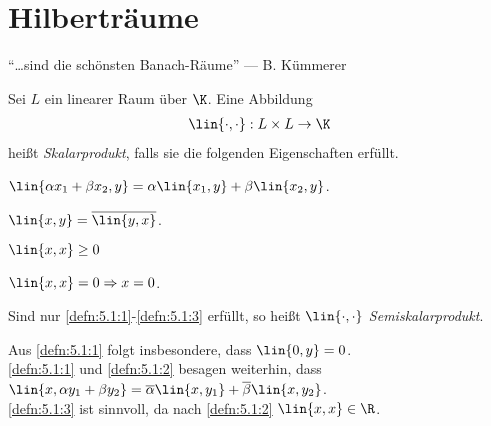 \chapter{Hilberträume}

``\ldots sind die schönsten Banach-Räume'' --- B. Kümmerer

\begin{defn}
\label{defn:5.1}
Sei $L$ ein linearer Raum über $\K$. Eine Abbildung
\begin{align*}
\lin{\cdot,\cdot} : L\times L \to \K
\end{align*}
heißt \emph{Skalarprodukt}, falls sie die folgenden
Eigenschaften erfüllt.
\begin{defnenum}
  \item\label{defn:5.1:1} $\lin{\alpha x_1+\beta x_2,y} = \alpha\lin{x_1,y}+
  \beta\lin{x_2,y}$.
  \item\label{defn:5.1:2} $\lin{x,y}=\overline{\lin{y,x}}$.
  \item\label{defn:5.1:3} $\lin{x,x} \ge 0$
  \item\label{defn:5.1:4} $\lin{x,x}=0\Rightarrow x=0$.
\end{defnenum}
Sind nur \ref{defn:5.1:1}-\ref{defn:5.1:3} erfüllt, so heißt
$\lin{\cdot,\cdot}$ \emph{Semiskalarprodukt}.\fishhere
\end{defn}

Aus \ref{defn:5.1:1} folgt insbesondere, dass $\lin{0,y}=0$.\\
\ref{defn:5.1:1} und \ref{defn:5.1:2} besagen weiterhin, dass $\lin{x,\alpha
y_1+\beta y_2}=\overline{\alpha}\lin{x,y_1}+\overline{\beta}\lin{x,y_2}$.\\
\ref{defn:5.1:3} ist sinnvoll, da nach \ref{defn:5.1:2} $\lin{x,x}\in\R$.

